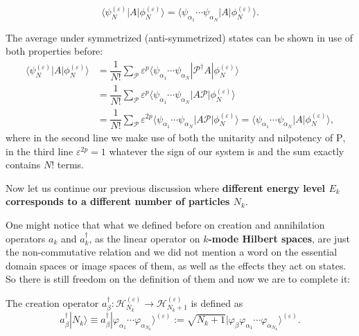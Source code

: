 \documentclass[b5paper,10pt,UTF8]{book}
\numberwithin{equation}{section}
\begin{document}
 		\begin{Lemma}
 			 \begin{equation}\label{1.4.9}
 			 	\langle\psi_N^{(\varepsilon)}|A|\phi_N^{(\varepsilon)}\rangle=\langle\psi_{\alpha_1}\cdots\psi_{\alpha_N}|A|\phi_N^{(\varepsilon)}\rangle.
 			 \end{equation}
 		\end{Lemma}
 		\begin{Proof}
 			The average under symmetrized (anti-symmetrized) states can be shown in use of both properties before:
 			\begin{align*}
 				\langle\psi_N^{(\varepsilon)}|A|\phi_N^{(\varepsilon)}\rangle&=\dfrac{1}{N!}\sum_{\mathcal{P}}\varepsilon^p\langle\psi_{\alpha_1}\cdots\psi_{\alpha_N}|\mathcal{P}^\dagger A|\phi_N^{(\varepsilon)}\rangle\\
 				&=\dfrac{1}{N!}\sum_{\mathcal{P}}\varepsilon^p\langle\psi_{\alpha_1}\cdots\psi_{\alpha_N}|A\mathcal{P}|\phi_N^{(\varepsilon)}\rangle\\
 				&=\dfrac{1}{N!}\sum_{\mathcal{P}}\varepsilon^{2p}\langle\psi_{\alpha_1}\cdots\psi_{\alpha_N}|A\mathcal{P}|\phi_N^{(\varepsilon)}\rangle=\langle\psi_{\alpha_1}\cdots\psi_{\alpha_N}|A|\phi_N^{(\varepsilon)}\rangle,
 			\end{align*}
 			where in the second line we make use of both the unitarity and nilpotency of $\mathrm{P}$, in the third line $\varepsilon^{2p}=1$ whatever the sign of our system is and the sum exactly contains $N!$ terms. 
 		\end{Proof}
 		\hfill\par
 		Now let us continue our previous discussion where \textbf{different energy level $E_k$ corresponds to a different number of particles $N_k$}.\par 
 		One might notice that what we defined before on creation and annihilation operators $a_k$ and $a_k^\dagger$, as the linear operator on \textbf{$k$-mode Hilbert spaces}, are just the non-commutative relation and we did not mention a word on the essential domain spaces or image spaces of them, as well as the effects they act on states. So there is still freedom on the definition of them and now we are to complete it:
 		\begin{Def}
	 		The creation operator $a_\beta^\dagger:\mathcal{H}_{N_k}^{(\varepsilon)}\rightarrow\mathcal{H}_{N_k+1}^{(\varepsilon)}$ is defined as
 			\begin{equation}\label{1.4.3}
 				a^\dagger_\beta|N_k\rangle\equiv a^\dagger_\beta|\varphi_{\alpha_1}\cdots\varphi_{\alpha_{N_k}}\rangle^{(\varepsilon)}:=\sqrt{N_k+1}|\varphi_\beta\varphi_{\alpha_1}\cdots\varphi_{\alpha_{N_k}}\rangle^{(\varepsilon)}.
 			\end{equation}
 		\end{Def}
\end{document}
